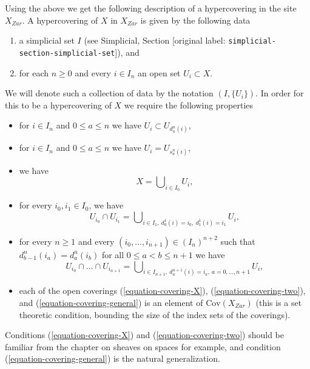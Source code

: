 \documentclass[10pt,a4paper]{article}
\theoremstyle{plain}
\theoremstyle{definition}
\theoremstyle{remark}
\numberwithin{equation}{subsection}
\begin{document}
\medskip\noindent
Using the above we get the following description of a hypercovering
in the site $X_{Zar}$. A hypercovering of $X$ in $X_{Zar}$
is given by the following data
\begin{enumerate}
\item a simplicial set $I$ (see
Simplicial, Section \textnormal{[original label: \nolinkurl{simplicial-section-simplicial-set}]}), and
\item for each $n \geq 0$ and every $i \in I_n$ an open set $U_i \subset X$.
\end{enumerate}
We will denote such a collection of data by the notation $(I, \{U_i\})$.
In order for this to be a hypercovering of $X$ we require
the following properties
\begin{itemize}
\item for $i \in I_n$ and $0 \leq a \leq n$
we have $U_i \subset U_{d^n_a(i)}$,
\item for $i \in I_n$ and $0 \leq a \leq n$ we have $U_i = U_{s^n_a(i)}$,
\item we have
\begin{equation}
\label{equation-covering-X}
X = \bigcup\nolimits_{i \in I_0} U_i,
\end{equation}
\item for every $i_0, i_1 \in I_0$, we have
\begin{equation}
\label{equation-covering-two}
U_{i_0} \cap U_{i_1} =
\bigcup\nolimits_{i \in I_1, \ d^1_0(i) = i_0, \ d^1_1(i) = i_1} U_i,
\end{equation}
\item for every $n \geq 1$ and every
$(i_0, \ldots, i_{n + 1}) \in (I_n)^{n + 2}$ such that
$d^n_{b - 1}(i_a) = d^n_a(i_b)$ for all $0\leq a < b\leq n + 1$
we have
\begin{equation}
\label{equation-covering-general}
U_{i_0} \cap \ldots \cap U_{i_{n + 1}} =
\bigcup\nolimits_{i \in I_{n + 1},
\ d^{n + 1}_a(i) = i_a, \ a = 0, \ldots, n + 1} U_i,
\end{equation}
\item each of the open coverings (\ref{equation-covering-X}),
(\ref{equation-covering-two}), and (\ref{equation-covering-general})
is an element of $\text{Cov}(X_{Zar})$
(this is a set theoretic condition, bounding
the size of the index sets of the coverings).
\end{itemize}
Conditions (\ref{equation-covering-X}) and
(\ref{equation-covering-two}) should be familiar from the
chapter on sheaves on spaces for example, and condition
(\ref{equation-covering-general}) is the natural generalization.
\end{document}
